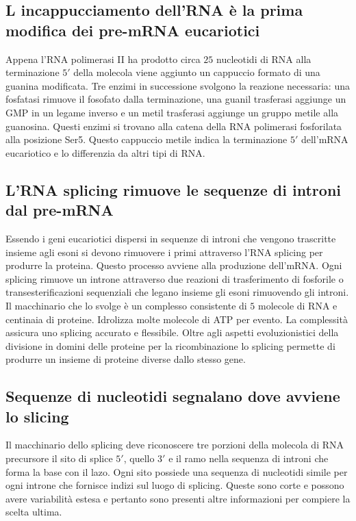 \subsection{L incappucciamento dell'RNA \`e la prima modifica dei pre-mRNA eucariotici}
Appena l'RNA polimerasi II ha prodotto circa $25$ nucleotidi di RNA alla terminazione $5'$ della molecola viene aggiunto un cappuccio formato di una guanina modificata. Tre enzimi in 
successione svolgono la reazione necessaria: una fosfatasi rimuove il fosofato dalla terminazione, una guanil trasferasi aggiunge un GMP in un legame inverso e un metil trasferasi
aggiunge un gruppo metile alla guanosina. Questi enzimi si trovano alla catena della RNA polimerasi fosforilata alla posizione Ser5. Questo cappuccio metile indica la terminazione
$5'$ dell'mRNA eucariotico e lo differenzia da altri tipi di RNA. 
\subsection{L'RNA splicing rimuove le sequenze di introni dal pre-mRNA}
Essendo i geni eucariotici dispersi in sequenze di introni che vengono trascritte insieme agli esoni si devono rimuovere i primi attraverso l'RNA splicing per produrre la proteina.
Questo processo avviene alla produzione dell'mRNA. Ogni splicing rimuove un introne attraverso due reazioni di trasferimento di fosforile o transesterificazioni sequenziali che legano 
insieme gli esoni rimuovendo gli introni. Il macchinario che lo svolge \`e un complesso consistente di $5$ molecole di RNA e centinaia di proteine. Idrolizza molte molecole di ATP per
evento. La complessit\`a assicura uno splicing accurato e flessibile. Oltre agli aspetti evoluzionistici della divisione in domini delle proteine per la ricombinazione lo splicing
permette di produrre un insieme di proteine diverse dallo stesso gene. 
\subsection{Sequenze di nucleotidi segnalano dove avviene lo slicing}
Il macchinario dello splicing deve riconoscere tre porzioni della molecola di RNA precursore il sito di splice $5'$, quello $3'$ e il ramo nella sequenza di introni che forma la base
con il lazo. Ogni sito possiede una sequenza di nucleotidi simile per ogni introne che fornisce indizi sul luogo di splicing. Queste sono corte e possono avere variabilit\`a estesa e 
pertanto sono presenti altre informazioni per compiere la scelta ultima. 
